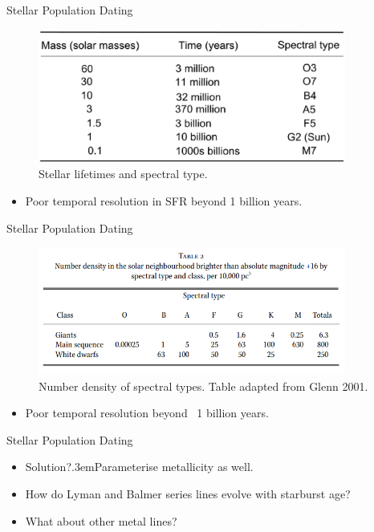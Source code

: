 \documentclass{beamer}
\newcommand\KKKK{\kern.3em} %
\begin{document}
\begin{frame}{Stellar Population Dating}
  \begin{figure}
    \centering
    \includegraphics[width=0.9\textwidth]{lifetimes}
    \caption{Stellar lifetimes and spectral type.}
  \end{figure}
  \begin{itemize}
    \item Poor temporal resolution in SFR beyond 1 billion years.
  \end{itemize}
\end{frame}

\begin{frame}{Stellar Population Dating}
  \begin{figure}
    \centering
    \includegraphics[width=0.9\textwidth]{Screenshot.png}
    \caption{Number density of spectral types. Table adapted from Glenn 2001.\cite{Glenn_2001}}
  \end{figure}
  \begin{itemize}
    \item Poor temporal resolution beyond ~1 billion years.
  \end{itemize}
\end{frame}

\begin{frame}{Stellar Population Dating}
  \begin{itemize}
    \item Solution?\pause \KKKK Parameterise metallicity as well.\pause
    \item How do Lyman and Balmer series lines evolve with starburst age?
    \item What about other metal lines?
  \end{itemize}
\end{frame}
\end{document}
